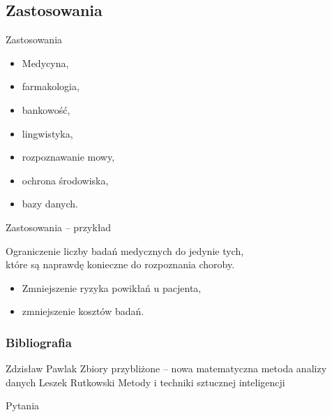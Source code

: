 \documentclass[10pt]{beamer}
\begin{document}
\subsection{Zastosowania}
\begin{frame}{Zastosowania}
\begin{spacing}{1.5}
\begin{itemize}
\item Medycyna,
\item farmakologia,
\item bankowość,
\item lingwistyka,
\item rozpoznawanie mowy,
\item ochrona środowiska,
\item bazy danych.
\end{itemize}
\end{spacing}
\end{frame}


\begin{frame}{Zastosowania -- przykład}
\begin{spacing}{1.5}
Ograniczenie liczby badań medycznych do jedynie tych,\\które są naprawdę konieczne do rozpoznania choroby.

\begin{itemize}
\item Zmniejszenie ryzyka powikłań u pacjenta,
\item zmniejszenie kosztów badań.
\end{itemize}
\end{spacing}
\end{frame}




\begin{frame}
\frametitle{Bibliografia}
\footnotesize
{
\begin{thebibliography}{99}
 Zdzisław Pawlak
\newblock Zbiory przybliżone -- nowa matematyczna metoda analizy danych 
 Leszek Rutkowski
\newblock Metody i techniki sztucznej inteligencji
\end{thebibliography}
}
\end{frame}


{\1
\begin{frame}
  \finalpage
  {
  \begin{huge}
  	Pytania
  \end{huge}
  
  }
\end{frame}
}
\end{document}

